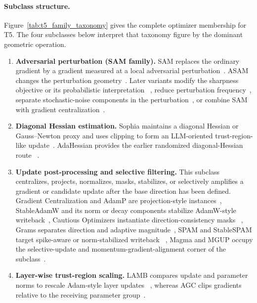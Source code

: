 \paragraph{Subclass structure.}
Figure~\ref{tab:t5_family_taxonomy} gives the complete optimizer membership for
T5.  The four subclasses below interpret that taxonomy figure by the dominant
geometric operation.
\begin{enumerate}[label=\textbf{T5.\arabic*},leftmargin=*,itemsep=2pt]
  \item \textbf{Adversarial perturbation (SAM family).}
  SAM replaces the ordinary gradient by a gradient measured at a local
  adversarial perturbation~\citep{foret2021sharpness}.  ASAM changes the
  perturbation geometry~\citep{kwon2021asam}.  Later variants modify the
  sharpness objective or its probabilistic interpretation
  ~\citep{zhuang2022surrogate,yue2023sharpness,mollenhoff2022sam}, reduce perturbation
  frequency~\citep{liu2022towards}, separate stochastic-noise components in
  the perturbation~\citep{li2024friendly}, or combine SAM with gradient
  centralization~\citep{hassan2025gcsam}.
  \item \textbf{Diagonal Hessian estimation.}
  Sophia maintains a diagonal Hessian or Gauss--Newton proxy and uses clipping
  to form an LLM-oriented trust-region-like update~\citep{liu2023sophia}.
  AdaHessian provides the earlier randomized diagonal-Hessian route
  ~\citep{yao2021adahessian}.
  \item \textbf{Update post-processing and selective filtering.}
  This subclass centralizes, projects, normalizes, masks, stabilizes, or
  selectively amplifies a gradient or candidate update after the base direction
  has been defined.  Gradient Centralization and AdamP are projection-style
  instances~\citep{yong2020gradient,heo2020adamp}, StableAdamW and its norm or
  decay components stabilize AdamW-style writeback~\citep{wortsman2023stable},
  Cautious Optimizers instantiate direction-consistency masks
  ~\citep{liang2024cautious}, Grams separates direction and adaptive
  magnitude~\citep{cao2024grams}, SPAM and StableSPAM target spike-aware or
  norm-stabilized writeback
  ~\citep{huang2025spam,huanggradientstabilizer}, Magma and
  MGUP occupy the selective-update and momentum-gradient-alignment corner of
  the subclass~\citep{joo2026surprising,chang2026mgup}.
  \item \textbf{Layer-wise trust-region scaling.}
  LAMB compares update and parameter norms to rescale Adam-style layer updates
  ~\citep{you2019large}, whereas AGC clips gradients relative to the receiving
  parameter group~\citep{brock2021high}.
\end{enumerate}

